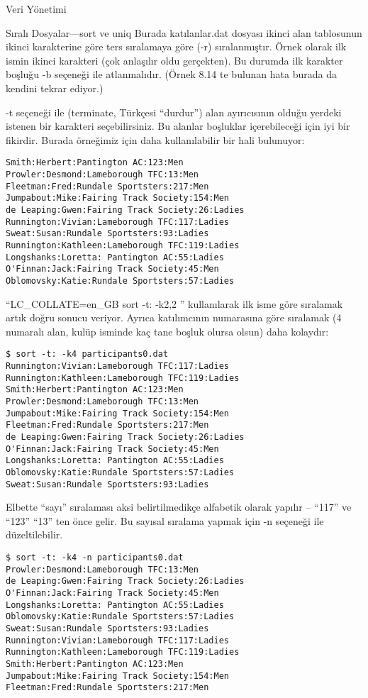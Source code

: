 \begin{section}{Veri Yönetimi}
\begin{subsection}{Sıralı Dosyalar—sort ve uniq}
Burada katılanlar.dat dosyası ikinci alan tablosunun ikinci karakterine göre ters sıralamaya göre (-r) sıralanmıştır. Örnek olarak ilk ismin ikinci karakteri (çok anlaşılır oldu gerçekten). Bu durumda ilk karakter boşluğu -b seçeneği ile atlanmalıdır. (Örnek 8.14 te bulunan hata burada da kendini tekrar ediyor.) 

-t seçeneği ile (terminate, Türkçesi “durdur”) alan ayırıcısının olduğu yerdeki istenen bir karakteri seçebilirsiniz. Bu alanlar boşluklar içerebileceği için iyi bir fikirdir. Burada örneğimiz için daha kullanılabilir bir hali bulunuyor:
\footnotesize
\begin{verbatim}
Smith:Herbert:Pantington AC:123:Men
Prowler:Desmond:Lameborough TFC:13:Men
Fleetman:Fred:Rundale Sportsters:217:Men
Jumpabout:Mike:Fairing Track Society:154:Men
de Leaping:Gwen:Fairing Track Society:26:Ladies
Runnington:Vivian:Lameborough TFC:117:Ladies
Sweat:Susan:Rundale Sportsters:93:Ladies
Runnington:Kathleen:Lameborough TFC:119:Ladies
Longshanks:Loretta: Pantington AC:55:Ladies
O'Finnan:Jack:Fairing Track Society:45:Men
Oblomovsky:Katie:Rundale Sportsters:57:Ladies
\end{verbatim}
\normalsize

“LC\_COLLATE=en\_GB sort -t: -k2,2 ” kullanılarak ilk isme göre sıralamak artık doğru sonucu veriyor. Ayrıca katılımcının numarasına göre sıralamak (4 numaralı alan, kulüp isminde kaç tane boşluk olursa olsun) daha kolaydır:
\footnotesize
\begin{verbatim}
$ sort -t: -k4 participants0.dat
Runnington:Vivian:Lameborough TFC:117:Ladies
Runnington:Kathleen:Lameborough TFC:119:Ladies
Smith:Herbert:Pantington AC:123:Men
Prowler:Desmond:Lameborough TFC:13:Men
Jumpabout:Mike:Fairing Track Society:154:Men
Fleetman:Fred:Rundale Sportsters:217:Men
de Leaping:Gwen:Fairing Track Society:26:Ladies
O'Finnan:Jack:Fairing Track Society:45:Men
Longshanks:Loretta: Pantington AC:55:Ladies
Oblomovsky:Katie:Rundale Sportsters:57:Ladies
Sweat:Susan:Rundale Sportsters:93:Ladies
\end{verbatim}
\normalsize

Elbette “sayı” sıralaması aksi belirtilmedikçe alfabetik olarak yapılır – “117” ve “123” “13” ten önce gelir. Bu sayısal sıralama yapmak için -n seçeneği ile düzeltilebilir.
\footnotesize
\begin{verbatim}
$ sort -t: -k4 -n participants0.dat
Prowler:Desmond:Lameborough TFC:13:Men
de Leaping:Gwen:Fairing Track Society:26:Ladies
O'Finnan:Jack:Fairing Track Society:45:Men
Longshanks:Loretta: Pantington AC:55:Ladies
Oblomovsky:Katie:Rundale Sportsters:57:Ladies
Sweat:Susan:Rundale Sportsters:93:Ladies
Runnington:Vivian:Lameborough TFC:117:Ladies
Runnington:Kathleen:Lameborough TFC:119:Ladies
Smith:Herbert:Pantington AC:123:Men
Jumpabout:Mike:Fairing Track Society:154:Men
Fleetman:Fred:Rundale Sportsters:217:Men
\end{verbatim}
\normalsize


\end{subsection}
\end{section}
